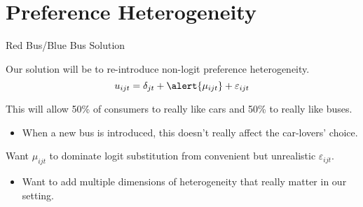 \documentclass[aspectratio=169,t,11pt,table]{beamer}
\begin{document}
\section{Preference Heterogeneity}

\begin{frame}{Red Bus/Blue Bus Solution}
    \begin{wideitemize}
        \item Our solution will be to re-introduce non-logit preference heterogeneity.
        \begin{equation*}
            u_{ijt} = \delta_{jt} + \alert{\mu_{ijt}} + \varepsilon_{ijt}
        \end{equation*}
        \vspace{-\baselineskip}
        \pause
        \item This will allow 50\% of consumers to really like cars and 50\% to really like buses.
        \begin{itemize}
            \item When a new bus is introduced, this doesn't really affect the car-lovers' choice.
        \end{itemize}
        \pause
        \item Want $\mu_{ijt}$ to dominate logit substitution from convenient but unrealistic $\varepsilon_{ijt}$.
        \begin{itemize}
            \item Want to add multiple dimensions of heterogeneity that really matter in our setting.
        \end{itemize}
    \end{wideitemize}
\end{frame}
\end{document}
